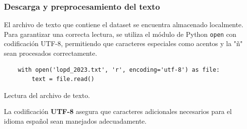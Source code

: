 \documentclass{article}
\begin{document}
\subsubsection{Descarga y preprocesamiento del texto}
El archivo de texto que contiene el dataset se encuentra almacenado localmente. Para garantizar una correcta lectura, se utiliza el módulo de Python \texttt{open} con codificación UTF-8, permitiendo que caracteres especiales como acentos y la "ñ" sean procesados correctamente.

\begin{listing}[H]
\begin{verbatim}
    with open('lopd_2023.txt', 'r', encoding='utf-8') as file:
        text = file.read()
\end{verbatim}
\caption{Lectura del archivo de texto.}
\end{listing}

\begin{tcolorbox}[colback=yellow!10!white, colframe=orange!80!black, title=Punto clave]
    La codificación \textbf{UTF-8} asegura que caracteres adicionales necesarios para el idioma español sean manejados adecuadamente.
\end{tcolorbox}
\end{document}
